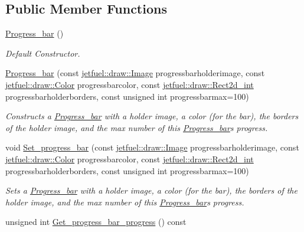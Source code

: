 \subsection*{Public Member Functions}
\begin{DoxyCompactItemize}
\item 
\hyperlink{classjetfuel_1_1gui_1_1Progress__bar_a82ff3b06366efe839c6031281db9b9ac}{Progress\+\_\+bar} ()
\begin{DoxyCompactList}\small\item\em Default Constructor. \end{DoxyCompactList}\item 
\hyperlink{classjetfuel_1_1gui_1_1Progress__bar_a77c734bd7d04bd5f8a0f9bf6d2c600e5}{Progress\+\_\+bar} (const \hyperlink{classjetfuel_1_1draw_1_1Image}{jetfuel\+::draw\+::\+Image} progressbarholderimage, const \hyperlink{classjetfuel_1_1draw_1_1Color}{jetfuel\+::draw\+::\+Color} progressbarcolor, const \hyperlink{classjetfuel_1_1draw_1_1Rect2d}{jetfuel\+::draw\+::\+Rect2d\+\_\+int} progressbarholderborders, const unsigned int progressbarmax=100)
\begin{DoxyCompactList}\small\item\em Constructs a \hyperlink{classjetfuel_1_1gui_1_1Progress__bar}{Progress\+\_\+bar} with a holder image, a color (for the bar), the borders of the holder image, and the max number of this \hyperlink{classjetfuel_1_1gui_1_1Progress__bar}{Progress\+\_\+bar}\textquotesingle{}s progress. \end{DoxyCompactList}\item 
void \hyperlink{classjetfuel_1_1gui_1_1Progress__bar_aef1b768b22c17ce9dab2fd12a9370262}{Set\+\_\+progress\+\_\+bar} (const \hyperlink{classjetfuel_1_1draw_1_1Image}{jetfuel\+::draw\+::\+Image} progressbarholderimage, const \hyperlink{classjetfuel_1_1draw_1_1Color}{jetfuel\+::draw\+::\+Color} progressbarcolor, const \hyperlink{classjetfuel_1_1draw_1_1Rect2d}{jetfuel\+::draw\+::\+Rect2d\+\_\+int} progressbarholderborders, const unsigned int progressbarmax=100)
\begin{DoxyCompactList}\small\item\em Sets a \hyperlink{classjetfuel_1_1gui_1_1Progress__bar}{Progress\+\_\+bar} with a holder image, a color (for the bar), the borders of the holder image, and the max number of this \hyperlink{classjetfuel_1_1gui_1_1Progress__bar}{Progress\+\_\+bar}\textquotesingle{}s progress. \end{DoxyCompactList}\item 
unsigned int \hyperlink{classjetfuel_1_1gui_1_1Progress__bar_ae1fc30f6eacefc0fcca909d7d3f52225}{Get\+\_\+progress\+\_\+bar\+\_\+progress} () const

\end{DoxyCompactItemize}
